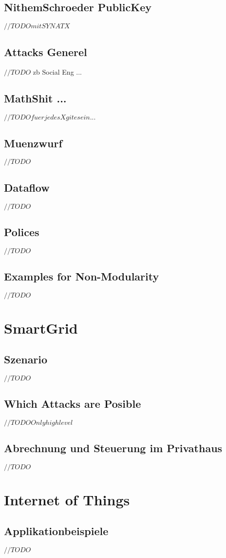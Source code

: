 \documentclass[a4paper, 12pt]{article}
\begin{document}
\subsection{NithemSchroeder PublicKey}
$ //TODO mit SYNATX $
\subsection{Attacks Generel}
$ //TODO $
zb Social Eng ...
\subsection{MathShit ...}
$ //TODO fuer jedes X git es ein ... $
\subsection{Muenzwurf}
$ //TODO $
\subsection{Dataflow}
$ //TODO $
\subsection{Polices}
$ //TODO $
\subsection{Examples for Non-Modularity}
$ //TODO $

\section{SmartGrid}
\subsection{Szenario}
$ //TODO $
\subsection{Which Attacks are Posible}
$ //TODO Only highlevel$
\subsection{Abrechnung und Steuerung im Privathaus}
$ //TODO $

\section{Internet of Things}
\subsection{Applikationbeispiele}
$ //TODO $
\end{document}
